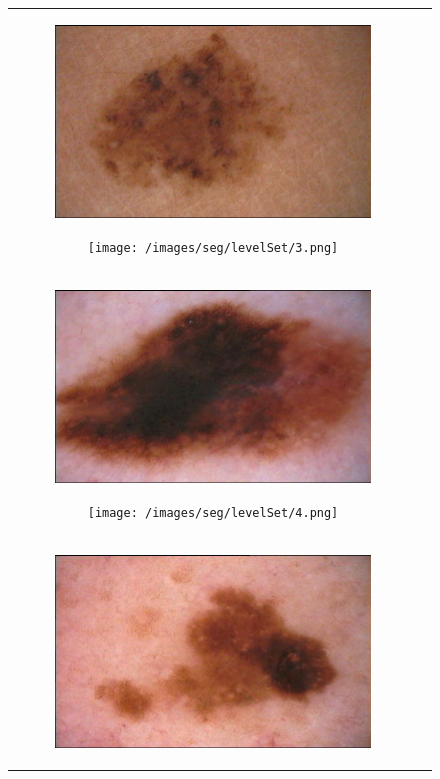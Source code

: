 \documentclass[a4paper, 10pt, conference]{ieeeconf}        %
\begin{document}
\begin{figure}[ht!]
\begin{tabular}{c c}
\begin{subfigure}{0.2\textwidth}
   \includegraphics[scale=0.15]{original03.JPG}
   \caption{}
   \end{subfigure}
   \begin{subfigure}{0.2\textwidth}
   \texttt{[image: /images/seg/levelSet/3.png]}
   \caption{}
   \end{subfigure}\\
  \begin{subfigure}{0.2\textwidth}
   \includegraphics[scale=0.15]{original04.JPG}\caption{}
   \end{subfigure}
   \begin{subfigure}{0.2\textwidth}
   \texttt{[image: /images/seg/levelSet/4.png]}
   \caption{}
   \end{subfigure}\\
  \begin{subfigure}{0.2\textwidth}
  \includegraphics[scale=0.15]{original05.JPG}\caption{}

\end{subfigure}
\end{tabular}
\end{figure}
\end{document}
